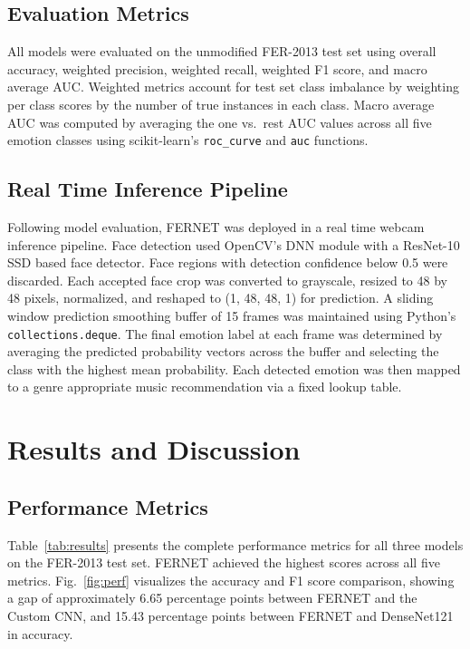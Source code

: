 \documentclass[conference]{IEEEtran}
\begin{document}
\subsection{Evaluation Metrics}

All models were evaluated on the unmodified FER-2013 test set using overall
accuracy, weighted precision, weighted recall, weighted F1 score, and macro
average AUC. Weighted metrics account for test set class imbalance by
weighting per class scores by the number of true instances in each class.
Macro average AUC was computed by averaging the one vs.\ rest AUC values
across all five emotion classes using scikit-learn's \texttt{roc\_curve}
and \texttt{auc} functions.

\subsection{Real Time Inference Pipeline}

Following model evaluation, FERNET was deployed in a real time webcam
inference pipeline. Face detection used OpenCV's DNN module with a ResNet-10
SSD based face detector. Face regions with detection confidence below 0.5
were discarded. Each accepted face crop was converted to grayscale, resized
to 48 by 48 pixels, normalized, and reshaped to (1, 48, 48, 1) for
prediction. A sliding window prediction smoothing buffer of 15 frames was
maintained using Python's \texttt{collections.deque}. The final emotion
label at each frame was determined by averaging the predicted probability
vectors across the buffer and selecting the class with the highest mean
probability. Each detected emotion was then mapped to a genre appropriate
music recommendation via a fixed lookup table.

\section{Results and Discussion}

\subsection{Performance Metrics}

Table~\ref{tab:results} presents the complete performance metrics for all
three models on the FER-2013 test set. FERNET achieved the highest scores
across all five metrics. Fig.~\ref{fig:perf} visualizes the accuracy and
F1 score comparison, showing a gap of approximately 6.65 percentage points
between FERNET and the Custom CNN, and 15.43 percentage points between
FERNET and DenseNet121 in accuracy.
\end{document}

